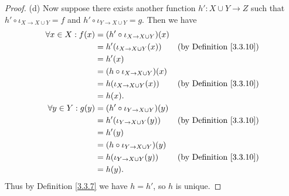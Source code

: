 \begin{proof}{(d)}
    Now suppose there exists another function \(h' : X \cup Y \to Z\) such that \(h' \circ \iota_{X \to X \cup Y} = f\) and \(h' \circ \iota_{Y \to X \cup Y} = g\).
    Then we have
    \begin{align*}
        \forall x \in X : f(x) & = (h' \circ \iota_{X \to X \cup Y})(x)                                       \\
                               & = h'(\iota_{X \to X \cup Y}(x))        & \text{(by Definition \ref{3.3.10})} \\
                               & = h'(x)                                                                      \\
                               & = (h \circ \iota_{X \to X \cup Y})(x)                                        \\
                               & = h(\iota_{X \to X \cup Y}(x))         & \text{(by Definition \ref{3.3.10})} \\
                               & = h(x).                                                                      \\
        \forall y \in Y : g(y) & = (h' \circ \iota_{Y \to X \cup Y})(y)                                       \\
                               & = h'(\iota_{Y \to X \cup Y}(y))        & \text{(by Definition \ref{3.3.10})} \\
                               & = h'(y)                                                                      \\
                               & = (h \circ \iota_{Y \to X \cup Y})(y)                                        \\
                               & = h(\iota_{Y \to X \cup Y}(y))         & \text{(by Definition \ref{3.3.10})} \\
                               & = h(y).
    \end{align*}
    Thus by Definition \ref{3.3.7} we have \(h = h'\), so \(h\) is unique.
\end{proof}